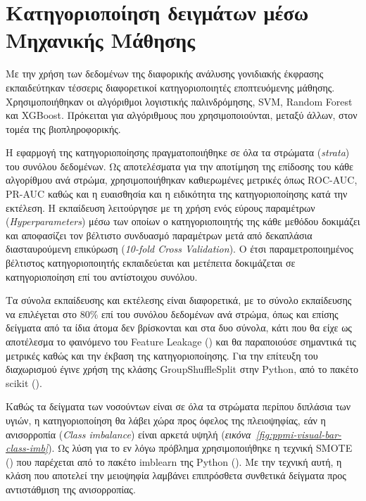 \documentclass[12pt]{report}
\begin{document}
    \section{Κατηγοριοποίηση δειγμάτων μέσω Μηχανικής Μάθησης}
        \par
            Με την χρήση των δεδομένων της διαφορικής ανάλυσης γονιδιακής έκφρασης εκπαιδεύτηκαν τέσσερις διαφορετικοί κατηγοριοποιητές εποπτευόμενης μάθησης. Χρησιμοποιήθηκαν οι αλγόριθμοι λογιστικής παλινδρόμησης, SVM, Random Forest και XGBoost. Πρόκειται για αλγόριθμους που χρησιμοποιούνται, μεταξύ άλλων, στον τομέα της βιοπληροφορικής.
        \par
            Η εφαρμογή της κατηγοριοποίησης πραγματοποιήθηκε σε όλα τα στρώματα (\emph{strata}) του συνόλου δεδομένων. Ως αποτελέσματα για την αποτίμηση της επίδοσης του κάθε αλγορίθμου ανά στρώμα, χρησιμοποιήθηκαν καθιερωμένες μετρικές όπως ROC-AUC, PR-AUC καθώς και η ευαισθησία και η ειδικότητα της κατηγοριοποίησης κατά την εκτέλεση. Η εκπαίδευση λειτούργησε με τη χρήση ενός εύρους παραμέτρων (\emph{Hyperparameters}) μέσω των οποίων ο κατηγοριοποιητής της κάθε μεθόδου δοκιμάζει και αποφασίζει τον βέλτιστο συνδυασμό παραμέτρων μετά από δεκαπλάσια διασταυρούμενη επικύρωση (\emph{10-fold Cross Validation}). Ο έτσι παραμετροποιημένος βέλτιστος κατηγοριοποιητής εκπαιδεύεται και μετέπειτα δοκιμάζεται σε κατηγοριοποίηση επί του αντίστοιχου συνόλου. 
        \par
            Τα σύνολα εκπαίδευσης και εκτέλεσης είναι διαφορετικά, με το σύνολο εκπαίδευσης να επιλέγεται στο 80\% επί του συνόλου δεδομένων ανά στρώμα, όπως και επίσης δείγματα από τα ίδια άτομα δεν βρίσκονται και στα δυο σύνολα, κάτι που θα είχε ως αποτέλεσμα το φαινόμενο του Feature Leakage (\emph{\cite{Oosterhuis2024LocalPredictions}}) και θα παραποιούσε σημαντικά τις μετρικές καθώς και την έκβαση της κατηγοριοποίησης. Για την επίτευξη του διαχωρισμού έγινε χρήση της κλάσης GroupShuffleSplit στην Python, από το πακέτο scikit (\emph{\cite{Buitinck2013APIProject}}). 
        \par
            Καθώς τα δείγματα των νοσούντων είναι σε όλα τα στρώματα περίπου διπλάσια των υγιών, η κατηγοριοποίηση θα λάβει χώρα προς όφελος της πλειοψηφίας, εάν η ανισορροπία (\emph{Class imbalance}) είναι αρκετά υψηλή (\emph{εικόνα~\ref{fig:ppmi-visual-bar-class-imb}}). Ως λύση για το εν λόγω πρόβλημα χρησιμοποιήθηκε η τεχνική SMOTE (\emph{\cite{Cemernek2024EffectsInterpretability}}) που παρέχεται από το πακέτο imblearn της Python (\emph{\cite{Lemaitre2016Imbalanced-learn:Learning}}). Με την τεχνική αυτή, η κλάση που αποτελεί την μειοψηφία λαμβάνει επιπρόσθετα συνθετικά δείγματα προς αντιστάθμιση της ανισορροπίας.
\end{document}
